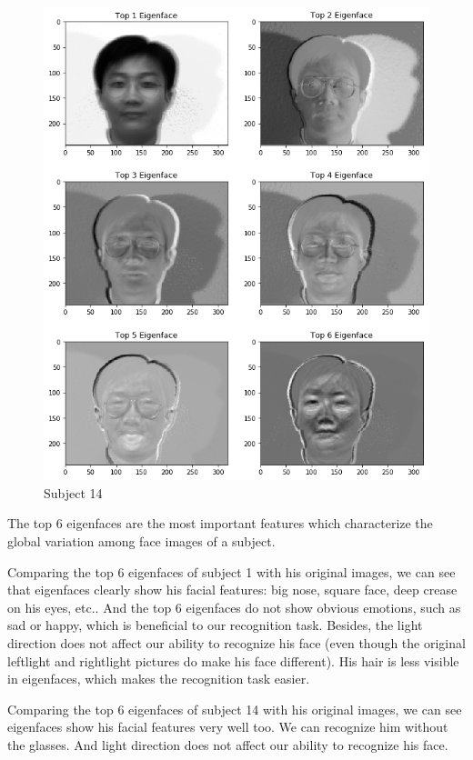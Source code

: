 \documentclass{article}
\begin{document}
\begin{figure}[h!]
\centering
  \caption{Subject 14}
  \includegraphics[scale = 0.36]{subject14.png}
\end{figure}

The top 6 eigenfaces are the most important features which characterize the global variation among face images of a subject.

Comparing the top 6 eigenfaces of subject 1 with his original images, we can see that eigenfaces clearly show his facial features: big nose, square face, deep crease on his eyes, etc.. And the top 6 eigenfaces do not show obvious emotions, such as sad or happy, which is beneficial to our recognition task. Besides, the light direction does not affect our ability to recognize his face (even though the original leftlight and rightlight pictures do make his face different). His hair is less visible in eigenfaces, which makes the recognition task easier.

Comparing the top 6 eigenfaces of subject 14 with his original images, we can see eigenfaces show his facial features very well too. We can recognize him without the glasses. And light direction does not affect our ability to recognize his face. 
\end{document}

